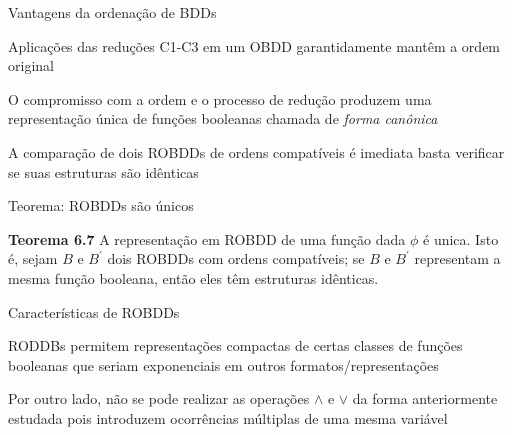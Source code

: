 \expandafter\documentclass\expandafter[table, usenames, svgnames, dvipsnames,14pt, \classopts]{beamer}
\begin{document}
\begin{frame}{Vantagens da ordenação de BDDs}

    \begin{outline}
        \1 Aplicações das reduções C1-C3 em um OBDD garantidamente mantêm a ordem original
        
        \vspace{1em}
        
        \1 O compromisso com a ordem e o processo de redução produzem uma representação única de funções booleanas
            \2[-] chamada de \textit{forma canônica}

            \vspace{1em}
            
        \1 A comparação de dois ROBDDs de ordens compatíveis é imediata
            \2[-] basta verificar se suas estruturas são idênticas
    \end{outline}

\end{frame}

\begin{frame}{Teorema: ROBDDs são únicos}

    \begin{block}{\textbf{Teorema 6.7}}
        A representação em ROBDD de uma função dada $\phi$ é unica. Isto é, sejam $B$ e $B^\prime$ dois ROBDDs com ordens compatíveis; se $B$ e $B^\prime$ representam a mesma função booleana, então eles têm estruturas idênticas.
    \end{block}

\end{frame}

\begin{frame}{Características de ROBDDs}

    \begin{outline}
        \1 RODDBs permitem representações compactas de certas classes de funções booleanas
            \2[-] que seriam exponenciais em outros formatos/representações
            
        \vspace{1em}
        
        \1 Por outro lado, não se pode realizar as operações $\land$ e $\lor$ da forma anteriormente estudada
            \2[-] pois introduzem ocorrências múltiplas de uma mesma variável
    \end{outline}

\end{frame}
\end{document}
